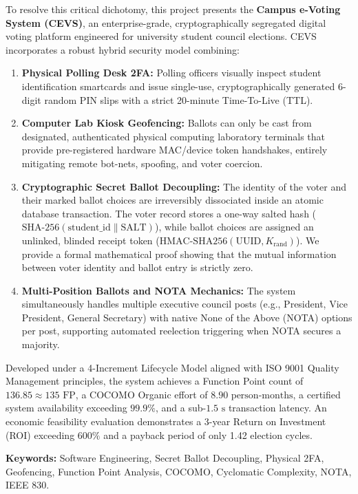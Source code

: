 \documentclass[12pt,a4paper,oneside]{report}
\begin{document}
To resolve this critical dichotomy, this project presents the \textbf{Campus e-Voting System (CEVS)}, an enterprise-grade, cryptographically segregated digital voting platform engineered for university student council elections. CEVS incorporates a robust hybrid security model combining:
\begin{enumerate}
    \item \textbf{Physical Polling Desk 2FA:} Polling officers visually inspect student identification smartcards and issue single-use, cryptographically generated 6-digit random PIN slips with a strict 20-minute Time-To-Live (TTL).
    \item \textbf{Computer Lab Kiosk Geofencing:} Ballots can only be cast from designated, authenticated physical computing laboratory terminals that provide pre-registered hardware MAC/device token handshakes, entirely mitigating remote bot-nets, spoofing, and voter coercion.
    \item \textbf{Cryptographic Secret Ballot Decoupling:} The identity of the voter and their marked ballot choices are irreversibly dissociated inside an atomic database transaction. The voter record stores a one-way salted hash ($\text{SHA-256}(\text{student\_id} \parallel \text{SALT})$), while ballot choices are assigned an unlinked, blinded receipt token ($\text{HMAC-SHA256}(\text{UUID}, K_{\text{rand}})$). We provide a formal mathematical proof showing that the mutual information between voter identity and ballot entry is strictly zero.
    \item \textbf{Multi-Position Ballots and NOTA Mechanics:} The system simultaneously handles multiple executive council posts (e.g., President, Vice President, General Secretary) with native None of the Above (NOTA) options per post, supporting automated reelection triggering when NOTA secures a majority.
\end{enumerate}

Developed under a 4-Increment Lifecycle Model aligned with ISO 9001 Quality Management principles, the system achieves a Function Point count of $136.85 \approx 135\text{ FP}$, a COCOMO Organic effort of $8.90\text{ person-months}$, a certified system availability exceeding $99.9\%$, and a sub-$1.5\text{ s}$ transaction latency. An economic feasibility evaluation demonstrates a 3-year Return on Investment (ROI) exceeding $600\%$ and a payback period of only 1.42 election cycles.

\vspace{0.8cm}
\noindent \textbf{Keywords:} Software Engineering, Secret Ballot Decoupling, Physical 2FA, Geofencing, Function Point Analysis, COCOMO, Cyclomatic Complexity, NOTA, IEEE 830.
\end{document}

